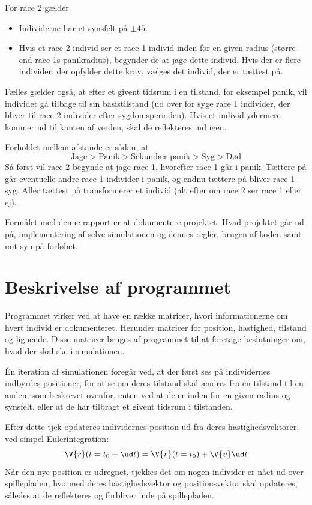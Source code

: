 \documentclass[a4paper,10pt]{article} 	%
\numberwithin{equation}{section}
\begin{document}
	For race 2 gælder
	\begin{itemize}
		\item Individerne har et synsfelt på $ \pm 45 $\Deg.
		\item Hvis et race 2 individ ser et race 1 individ inden for en given radius (større end race 1s panikradius), begynder de at jage dette individ. Hvis der er flere individer, der opfylder dette krav, vælges det individ, der er tættest på.
	\end{itemize}
	Fælles gælder også, at efter et givent tidsrum i en tilstand, for eksempel panik, vil individet gå tilbage til sin basistilstand (ud over for syge race 1 individer, der bliver til race 2 individer efter sygdomsperioden). Hvis et individ ydermere kommer ud til kanten af verden, skal de reflekteres ind igen.
	
	Forholdet mellem afstande er sådan, at 
	\begin{equation*}
		\text{Jage} > \text{Panik} > \text{Sekundær panik} > \text{Syg} > \text{Død}
	\end{equation*}
	Så først vil race 2 begynde at jage race 1, hvorefter race 1 går i panik. Tættere på går eventuelle andre race 1 individer i panik, og endnu tættere på bliver race 1 syg. Aller tættest på transformerer et individ (alt efter om race 2 ser race 1 eller ej).
	
	
	Formålet med denne rapport er at dokumentere projektet. Hvad projektet går ud på, implementering af selve simulationen og dennes regler, brugen af koden samt mit syn på forløbet.
	
	
	\section{Beskrivelse af programmet}
	Programmet virker ved at have en række matricer, hvori informationerne om hvert individ er dokumenteret. Herunder matricer for position, hastighed, tilstand og lignende. Disse matricer bruges af programmet til at foretage beslutninger om, hvad der skal ske i simulationen. 
	
	Én iteration af simulationen foregår ved, at der først ses på individernes indbyrdes positioner, for at se om deres tilstand skal ændres fra én tilstand til en anden, som beskrevet ovenfor, enten ved at de er inden for en given radius og synsfelt, eller at de har tilbragt et givent tidsrum i tilstanden.
	
	Efter dette tjek opdateres individernes position ud fra deres hastighedsvektorer, ved simpel Eulerintegration:
	\begin{equation*}
		\V{r}(t = t_0+ \ud t) = \V{r}(t=t_0) + \V{v} \ud t
	\end{equation*}
	Når den nye position er udregnet, tjekkes det om nogen individer er nået ud over spillepladen, hvormed deres hastighedsvektor og positionsvektor skal opdateres, således at de reflekteres og forbliver inde på spillepladen.
	
\end{document}
